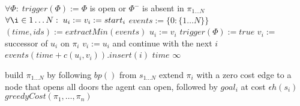 \documentclass[letterpaper]{article}
\begin{document}
\begin{algorithm}
\caption{$greedyCost(\pi_1,\ldots,\pi_n)$}
\label{alg:update}
\begin{algorithmic}
\STATE $\forall\Phi:\; trigger(\Phi) := \Phi$ is open or $\Phi^-$ is absent in $\pi_{1\ldots N}$
\STATE $\forall \i\in 1\ldots N:\; u_i := v_i := start_i$
\STATE $events := \{0: \{1\ldots N\}\}$
\STATE $(time, ids) := extractMin(events)$
\STATE $u_i := v_i$
\STATE $trigger(\Phi) := true$
\ENDIF
\ENDFOR
\ENDFOR
{}
\STATE $v_i :=$ successor of $u_i$ on $\pi_i$
\STATE $v_i := u_i$ and continue with the next $i$
\ENDIF
\ENDFOR
\STATE $events(time+c(u_i,v_i)).insert(i)$
\ENDFOR
\ENDWHILE
{}
\RETURN $time$
\ELSE
\RETURN $\infty$
\ENDIF
\end{algorithmic}
\end{algorithm}

\begin{algorithm}
\caption{$jointPriority(s_1,\ldots,s_N)$}
\label{alg:update}
\begin{algorithmic}
\STATE build $\pi_{1\ldots N}$ by following $bp()$ from $s_{1\ldots N}$
\STATE extend $\pi_i$ with a zero cost edge to a node that opens all doors the agent can open, followed by $goal_i$ at cost $\epsilon h(s_i)$
\ENDFOR
\RETURN $greedyCost(\pi_1,\ldots,\pi_n)$
\end{algorithmic}
\end{algorithm}



\end{document}
